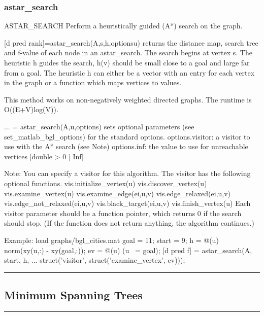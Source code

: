 \subsubsection*{astar\_search}
\begin{mcode}
  ASTAR_SEARCH Perform a heuristically guided (A*) search on the graph.
 
  [d pred rank]=astar_search(A,s,h,optionsu) returns the distance map,
  search tree and f-value of each node in an astar_search. 
  The search begins at vertex s.  The heuristic h guides the search, 
  h(v) should be small close to a goal and large far from a goal.  The
  heuristic h can either be a vector with an entry for each vertex in the
  graph or a function which maps vertices to values.
 
  This method works on non-negatively weighted directed graphs.
  The runtime is O((E+V)log(V)).
 
  ... = astar_search(A,u,options) sets optional parameters (see 
  set_matlab_bgl_options) for the standard options.
    options.visitor: a visitor to use with the A* search (see Note)
    options.inf: the value to use for unreachable vertices 
        [double > 0 | {Inf}]
    
  Note: You can specify a visitor for this algorithm.  The visitor has the
  following optional functions.
     vis.initialize_vertex(u)
     vis.discover_vertex(u)
     vis.examine_vertex(u)
     vis.examine_edge(ei,u,v)
     vis.edge_relaxed(ei,u,v)
     vis.edge_not_relaxed(ei,u,v)
     vis.black_target(ei,u,v)
     vis.finish_vertex(u)
  Each visitor parameter should be a function pointer, which returns 0
  if the search should stop.  (If the function does not return anything, 
  the algorithm continues.)
 
  Example:
    load graphs/bgl_cities.mat
    goal = 11; %
    start = 9; %
    h = @(u) norm(xy(u,:) - xy(goal,:));
    ev = @(u) (u ~= goal);
    [d pred f] = astar_search(A, start, h, ...
        struct('visitor', struct('examine_vertex', ev)));
\end{mcode}
\newpage
\hrule
\subsection*{Minimum Spanning Trees}
\vspace{1cm}
\hrule
